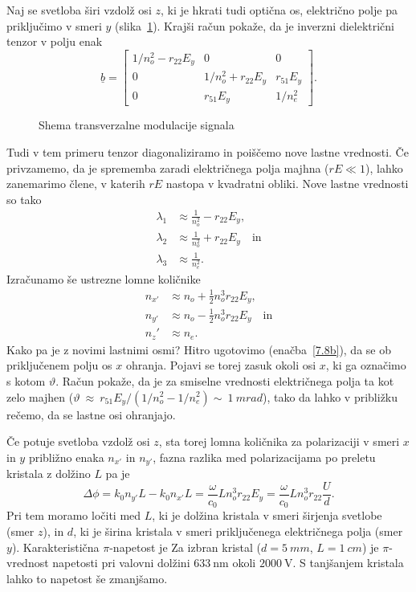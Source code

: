 Naj se svetloba širi vzdolž osi $z$, ki je hkrati tudi optična os, 
električno polje pa priključimo v smeri $y$ (slika~\ref{fig:tmshema}). 
Krajši račun pokaže, da je inverzni dielektrični tenzor v polju enak
\begin{equation}
\underline{b} = 
 \left[\begin{array}{ccc}
1/n_o^2  -r_{22}E_y& 0& 0\\
0& 1/n_o^2+r_{22}E_y& r_{51}E_y\\
0 & r_{51}E_y&  1/n_e^2
\end{array}\right].
\label{7.8b}
\end{equation}

\begin{figure}[h]
\centering
\def\svgwidth{80truemm} 

\caption{Shema transverzalne modulacije signala}
\label{fig:tmshema}
\end{figure}

Tudi v tem primeru tenzor diagonaliziramo in poiščemo nove lastne vrednosti.
Če privzamemo, da je sprememba zaradi električnega polja majhna ($rE\ll1$), lahko
zanemarimo člene, v katerih $rE$ nastopa v kvadratni obliki. Nove lastne vrednosti so tako
\begin{align}
\lambda_1 &\approx \frac{1}{n_o^2}-r_{22}E_y, \\
\lambda_2 &\approx \frac{1}{n_o^2}+ r_{22}E_y\quad \mathrm{in} \\
\lambda_3 &\approx \frac{1}{n_e^2}.
\end{align}
Izračunamo še ustrezne lomne količnike 
\begin{align}
n_{x'} &\approx n_o+\frac{1}{2}n_o^3r_{22}E_y,\\
n_{y'} &\approx n_o-\frac{1}{2}n_o^3r_{22}E_y \quad \mathrm{in}\\
n_z' &\approx n_e.
\end{align}
Kako pa je z novimi lastnimi osmi? 
Hitro ugotovimo (enačba~\ref{7.8b}), da se ob
priključenem polju os $x$ ohranja. Pojavi se torej zasuk okoli osi $x$,
ki ga označimo s kotom $\vartheta$. Račun pokaže, da je za smiselne
vrednosti električnega polja ta kot zelo majhen ($\vartheta~
\approx~r_{51}E_y/(1/n_o^2-1/n_e^2) \sim~1~\si{mrad}$),
tako da lahko v približku rečemo, da se lastne osi ohranjajo. 

Če potuje svetloba vzdolž osi $z$, sta torej lomna količnika za 
polarizaciji v smeri $x$ in $y$ približno enaka $n_{x'}$ in $n_{y'}$, fazna razlika med 
polarizacijama po preletu kristala z dolžino $L$ pa je 
\begin{equation}
\Delta \phi = k_0 n_{y'} L - k_0 n_{x'} L = \frac{\omega}{c_0}L 
n_o^3 r_{22}E_y = \frac{\omega}{c_0}L n_o^3 r_{22}\frac{U}{d}.
\label{fazaTM}
\end{equation}
Pri tem moramo ločiti med $L$, ki je dolžina kristala v smeri širjenja svetlobe
(smer $z$), in $d$, ki je širina kristala v smeri priključenega električnega polja 
(smer $y$). 
Karakteristična $\pi$-napetost je 
Za izbran kristal ($d=5~\si{mm}$, $L=1~\si{cm}$) je $\pi$-vrednost 
napetosti pri valovni dolžini $633~\si{\nano\metre}$ okoli $2000~\si{\volt}$. S tanjšanjem
kristala lahko to napetost še zmanjšamo.

